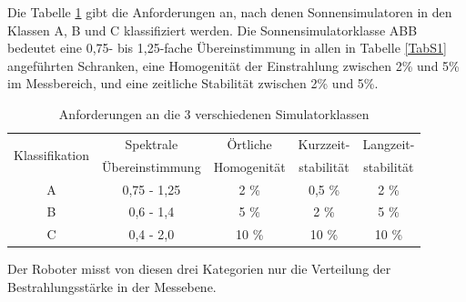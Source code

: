 \documentclass[a4paper,bibtotoc,oneside]{scrbook}
\begin{document}
Die Tabelle \ref{TabS2} gibt die Anforderungen an, nach denen Sonnensimulatoren in den Klassen A, B und C klassifiziert werden. Die Sonnensimulatorklasse ABB bedeutet eine 0,75- bis 1,25-fache Übereinstimmung in allen in Tabelle \ref{TabS1} angeführten Schranken, eine Homogenität der Einstrahlung zwischen 2\% und 5\% im Messbereich, und eine zeitliche Stabilität zwischen 2\% und 5\%. 
\begin{table}[htbp]
\centering
\begin{tabular}{ | c | c | c | c | c |}\hline
\multirow{2}{*}{Klassifikation} &  Spektrale  &  Örtliche  & {Kurzzeit-}& {Langzeit-}\\
& Übereinstimmung & Homogenität & {stabilität} & {stabilität} \\ 
\hline
\hline
A  & 0,75 - 1,25 & 2 \% & 0,5 \% & 2 \%\\ \hline
B  & 0,6 - 1,4 & 5 \% & 2 \% & 5 \%\\ \hline
C  & 0,4 - 2,0 & 10 \% & 10 \% & 10 \%\\ \hline
\end{tabular}
\caption{Anforderungen an die 3 verschiedenen Simulatorklassen}\label{TabS2}
\end{table}
Der Roboter misst von diesen drei Kategorien nur die Verteilung der Bestrahlungsstärke in der Messebene.
\end{document}

